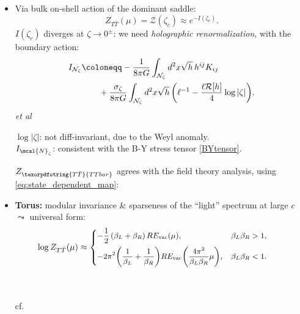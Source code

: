 \documentclass[10pt]{article}
\newcommand{\citations}[1]{{\footnotesize#1\par}}
\newcommand{\TTbar}{\texorpdfstring{\ensuremath{T\bar{T}}}{TTbar}\xspace}
\begin{document}
\begin{multicols}{3}
\begin{itemize}
\item Via bulk on-shell action of the dominant saddle:
	\begin{equation}
		Z_{T\bar T} (\mu) = \mathcal Z (\zeta_c) \approx  e^{-I(\zeta_c)}. \label{partition2}
	\end{equation}
$I(\zeta_c)$ \mbox{diverges} at $\zeta \to 0^\pm$: we need \textit{holographic renormalization}, with the boundary action:
	\begin{align}
		I_{\mathcal N_{\zeta}} & \coloneqq  - \frac{1}{8\pi G} \int_{\mathcal N_{\zeta}} d^2x \sqrt{h}\,h^{ij} K_{ij} \label{boundaryaction}
	\\& \qquad + \frac{\sigma_\zeta}{8\pi G} \int_{\mathcal N_{\zeta}} d^2x \sqrt{h} \, \bigg(\ell^{-1} - \frac{\ell  \mathcal{R}[h]}{4} \log |\zeta| \bigg). \notag
	\end{align}
	\hfill{\footnotesize \textcite{Henningson:1998gx} \textit{et al}}

	$\log |\zeta|$: not diff-invariant, due to the Weyl anomaly. \\
	$I_{\mcal{N}_\zeta}$: consistent with the B-Y stress tensor \eqref{BYtensor}.
	
	$Z_{\TTbar}$ agrees with the field theory analysis, using \eqref{eq:state_dependent_map}:

\item \textbf{Torus:} {modular invariance} \& sparseness of the ``light'' spectrum at large $c$ $\leadsto$ universal form:
	\begin{equation*}\small
	\hspace{-2.3em}
		\log   Z_{T\bar T}(\mu)  \approx \left\{ \begin{aligned}
		& {-\frac{1}{2}}\,(\beta_L + \beta_R)\, RE_{\text{vac}}(\mu),  &\beta_L \beta_R > 1, \\
		& {-2 \pi^2 \bigg(\frac{1}{\beta_L} + \frac{1}{\beta_R}\bigg)  RE_{\text{vac}}\bigg(\frac{4\pi^2}{\beta_L \beta_R} \mu \bigg)},  &\beta_L\beta_R < 1. %
		 \end{aligned} \right. %
	\end{equation*}
	\begin{flushright}
		\vspace{-.5\baselineskip}
		\citations{\noindent%
			\textcite{Datta:2018thy}\\
			\textcite{Apolo:2023aho}\\
			cf.~\textcite{Hartman:2014oaa}
		}
		\vspace{-.5\baselineskip}
	\end{flushright}


\end{itemize}
\end{multicols}
\end{document}
